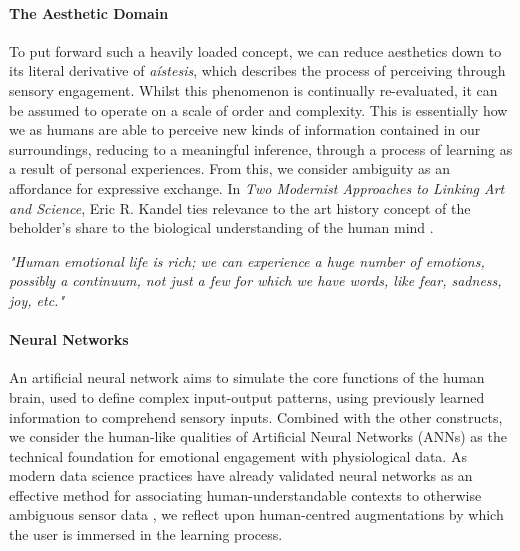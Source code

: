 
\paragraph{The Aesthetic Domain}

To put forward such a heavily loaded concept, we can reduce aesthetics down to its literal derivative of \textit{aístesis}, which describes the process of perceiving through sensory engagement. Whilst this phenomenon is continually re-evaluated, it can be assumed to operate on a scale of order and complexity. This is essentially how we as humans are able to perceive new kinds of information contained in our surroundings, reducing to a meaningful inference, through a process of learning as a result of personal experiences. From this, we consider ambiguity as an affordance for expressive exchange. In \textit{Two Modernist Approaches to Linking Art and Science}, Eric R. Kandel ties relevance to the art history concept of the beholder's share to the biological understanding of the human mind \cite{kandel_two_2013}.

\textit{"Human emotional life is rich; we can experience a huge number of emotions, possibly a continuum, not just a few for which we have words, like fear, sadness, joy, etc."} \citeauthor{perlovsky_aesthetic_2014} \cite{perlovsky_aesthetic_2014}


\paragraph{Neural Networks}

An artificial neural network aims to simulate the core functions of the human brain, used to define complex input-output patterns, using previously learned information to comprehend sensory inputs. Combined with the other constructs, we consider the human-like qualities of Artificial Neural Networks (ANNs) as the technical foundation for emotional engagement with physiological data. As modern data science practices have already validated neural networks as an effective method for associating human-understandable contexts to otherwise ambiguous sensor data \cite{bota_review_2019}, we reflect upon human-centred augmentations by which the user is immersed in the learning process.

